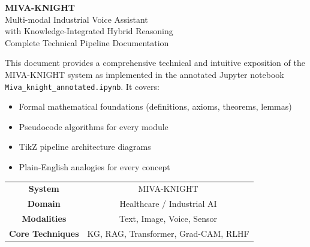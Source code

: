 \documentclass[12pt,a4paper]{article}
\begin{document}
\begin{titlepage}

\vspace*{1.5cm}
{\centering
{\color{white}\LARGE\bfseries MIVA-KNIGHT}\\[0.4cm]
{\color{white!85!mivablue}\large
  Multi-modal Industrial Voice Assistant\\[0.2cm]
  with Knowledge-Integrated Hybrid Reasoning}\\[0.6cm]
{\color{white!70!mivablue}\normalsize Complete Technical Pipeline Documentation}\\[2cm]
}

\begin{tcolorbox}[
  enhanced, colback=white, colframe=mivablue!40,
  arc=6pt, width=0.88\textwidth, center,
  title={\textbf{Document Scope}},
  fonttitle=\bfseries\color{mivablue},
  attach boxed title to top center={yshift=-2mm},
  boxed title style={colback=white, colframe=mivablue!40}
]
This document provides a comprehensive technical and intuitive exposition of the
MIVA-KNIGHT system as implemented in the annotated Jupyter notebook
\texttt{Miva\_knight\_annotated.ipynb}. It covers:
\begin{itemize}[leftmargin=1.5em]
  \item Formal mathematical foundations (definitions, axioms, theorems, lemmas)
  \item Pseudocode algorithms for every module
  \item TikZ pipeline architecture diagrams
  \item Plain-English analogies for every concept
\end{itemize}
\end{tcolorbox}

\vfill
{\centering
\begin{tabular}{cc}
\toprule
\textbf{System} & MIVA-KNIGHT \\
\textbf{Domain} & Healthcare / Industrial AI \\
\textbf{Modalities} & Text, Image, Voice, Sensor \\
\textbf{Core Techniques} & KG, RAG, Transformer, Grad-CAM, RLHF \\
\bottomrule
\end{tabular}
}
\end{titlepage}
\end{document}
